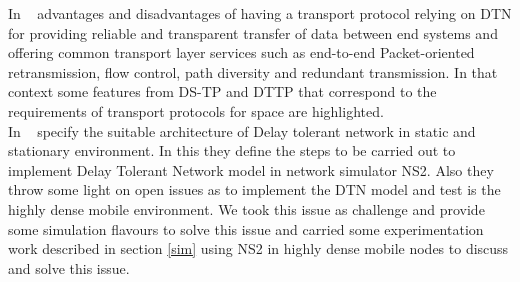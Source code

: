 \documentclass[3p,times]{elsarticle}
\begin{document}
In ~\cite{nr8} advantages and disadvantages of having a transport protocol relying on DTN for providing reliable and transparent transfer of data between end systems and offering common transport layer services such as end-to-end
Packet-oriented retransmission, flow control, path diversity and redundant transmission. In that context some features from DS-TP and DTTP that correspond to the requirements of transport protocols for space are highlighted.\\
In ~\cite{nr9} specify the suitable architecture of Delay tolerant network in static and stationary environment. In this they define the steps to be carried out to implement Delay Tolerant Network model in network simulator NS2. Also they throw some light on open issues as to implement the DTN model and test is the highly dense mobile environment. We took this issue as challenge and provide some simulation flavours to solve this issue and carried some experimentation work described in section \ref{sim} using NS2 in highly dense mobile nodes to discuss and solve this issue.  \\
\end{document}
